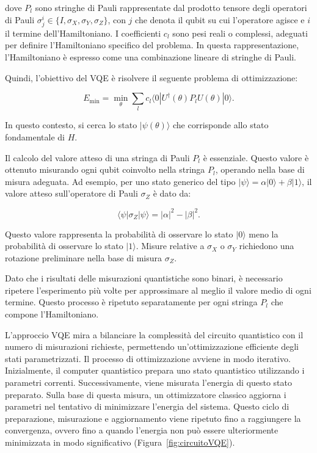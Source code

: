 dove \(P_l\) sono stringhe di Pauli rappresentate dal prodotto tensore degli 
operatori di Pauli \(\sigma_j^i \in \{I, \sigma_X, \sigma_Y, \sigma_Z\}\), 
con \(j\) che denota il qubit su cui l'operatore agisce e \(i\) il termine 
dell'Hamiltoniano. I coefficienti \(c_l\) sono pesi reali o complessi, 
adeguati per definire l'Hamiltoniano specifico del problema. In questa 
rappresentazione, l'Hamiltoniano è espresso come una combinazione lineare 
di stringhe di Pauli.

Quindi, l'obiettivo del VQE è risolvere il seguente problema di ottimizzazione:

\begin{equation}
    E_{\text{min}} = \min_\theta \sum_{l} c_l \langle 0 | U^\dagger(\theta) P_l U(\theta) | 0 \rangle.
\end{equation}

In questo contesto, si cerca lo stato \(|\psi(\theta)\rangle\) che corrisponde 
allo stato fondamentale di \(H\).

Il calcolo del valore atteso di una stringa di Pauli \(P_l\) è essenziale. 
Questo valore è ottenuto misurando ogni qubit coinvolto nella stringa \(P_l\), 
operando nella base di misura adeguata. Ad esempio, per uno stato generico del 
tipo \(|\psi\rangle = \alpha |0\rangle + \beta |1\rangle\), il valore atteso 
sull'operatore di Pauli \(\sigma_Z\) è dato da:

\begin{equation}
    \langle \psi | \sigma_Z | \psi \rangle = |\alpha|^2 - |\beta|^2.
\end{equation}

Questo valore rappresenta la probabilità di osservare lo stato \(|0\rangle\) meno 
la probabilità di osservare lo stato \(|1\rangle\). Misure relative a \(\sigma_X\) 
o \(\sigma_Y\) richiedono una rotazione preliminare nella base di misura \(\sigma_Z\).

Dato che i risultati delle misurazioni quantistiche sono binari, è necessario 
ripetere l'esperimento più volte per approssimare al meglio il valore medio 
di ogni termine. Questo processo è ripetuto separatamente per ogni stringa 
\(P_l\) che compone l'Hamiltoniano.

L'approccio VQE mira a bilanciare la complessità del circuito quantistico con il 
numero di misurazioni richieste, permettendo un'ottimizzazione efficiente degli 
stati parametrizzati. Il processo di ottimizzazione avviene in modo iterativo. 
Inizialmente, il computer quantistico prepara uno stato quantistico utilizzando 
i parametri correnti. Successivamente, viene misurata l'energia di questo stato 
preparato. Sulla base di questa misura, un ottimizzatore classico aggiorna i 
parametri nel tentativo di minimizzare l'energia del sistema. Questo ciclo di 
preparazione, misurazione e aggiornamento viene ripetuto fino a raggiungere la 
convergenza, ovvero fino a quando l'energia non può essere ulteriormente 
minimizzata in modo significativo (Figura~\ref{fig:circuitoVQE}).

